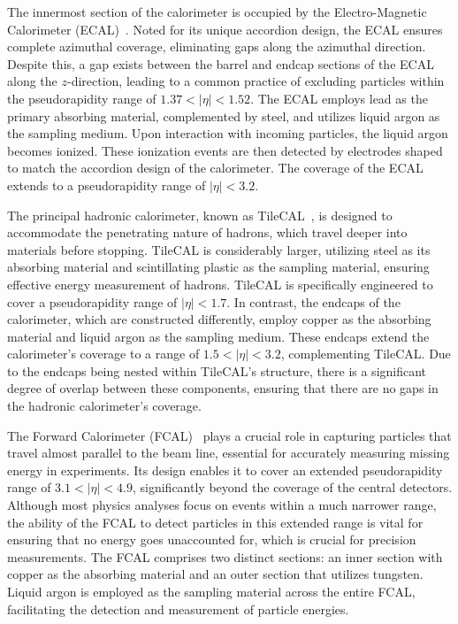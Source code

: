 The innermost section of the calorimeter is occupied by the Electro-Magnetic Calorimeter (ECAL)~\cite{ATLAS:1996ab}. Noted for its unique accordion design, the ECAL ensures complete azimuthal coverage, eliminating gaps along the azimuthal direction. Despite this, a gap exists between the barrel and endcap sections of the ECAL along the $z$-direction, leading to a common practice of excluding particles within the pseudorapidity range of \(1.37 < |\eta| < 1.52\). The ECAL employs lead as the primary absorbing material, complemented by steel, and utilizes liquid argon as the sampling medium. Upon interaction with incoming particles, the liquid argon becomes ionized. These ionization events are then detected by electrodes shaped to match the accordion design of the calorimeter. The coverage of the ECAL extends to a pseudorapidity range of \(|\eta| < 3.2\).

The principal hadronic calorimeter, known as TileCAL~\cite{ATLAS:1996aa}, is designed to accommodate the penetrating nature of hadrons, which travel deeper into materials before stopping. TileCAL is considerably larger, utilizing steel as its absorbing material and scintillating plastic as the sampling material, ensuring effective energy measurement of hadrons. TileCAL is specifically engineered to cover a pseudorapidity range of \(|\eta| < 1.7\). In contrast, the endcaps of the calorimeter, which are constructed differently, employ copper as the absorbing material and liquid argon as the sampling medium. These endcaps extend the calorimeter's coverage to a range of \(1.5 < |\eta| < 3.2\), complementing TileCAL. Due to the endcaps being nested within TileCAL's structure, there is a significant degree of overlap between these components, ensuring that there are no gaps in the hadronic calorimeter's coverage.

The Forward Calorimeter (FCAL)~\cite{AArtamonov_2008} plays a crucial role in capturing particles that travel almost parallel to the beam line, essential for accurately measuring missing energy in experiments. Its design enables it to cover an extended pseudorapidity range of \(3.1 < |\eta| < 4.9\), significantly beyond the coverage of the central detectors. Although most physics analyses focus on events within a much narrower range, the ability of the FCAL to detect particles in this extended range is vital for ensuring that no energy goes unaccounted for, which is crucial for precision measurements. The FCAL comprises two distinct sections: an inner section with copper as the absorbing material and an outer section that utilizes tungsten. Liquid argon is employed as the sampling material across the entire FCAL, facilitating the detection and measurement of particle energies.


